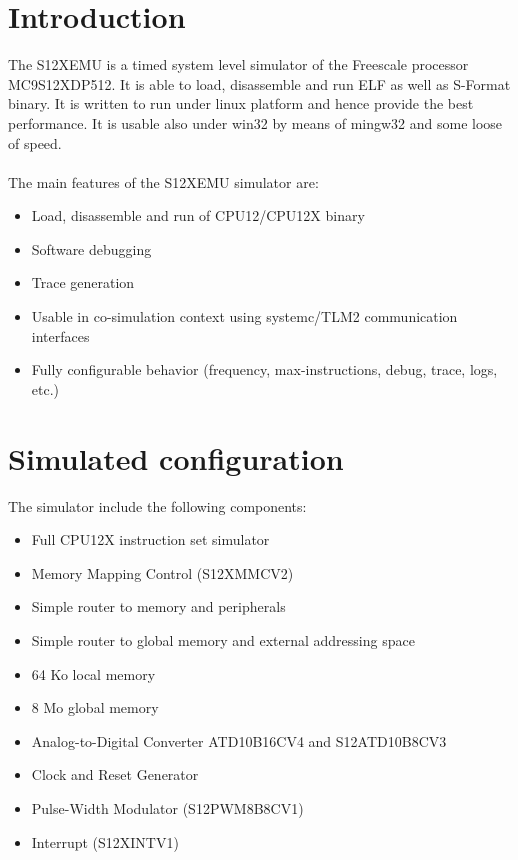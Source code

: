 \section {Introduction}

The S12XEMU is a timed system level simulator of the Freescale processor MC9S12XDP512. It is able to load, disassemble and run ELF as well as S-Format binary. It is written to run under linux platform and hence provide the best performance. It is usable also under win32 by means of mingw32 and some loose of speed.\\
\\
The main features of the S12XEMU simulator are:
\begin{itemize}\addtolength{\itemsep}{-0.40\baselineskip}
\item Load, disassemble and run of CPU12/CPU12X binary
\item Software debugging
\item Trace generation
\item Usable in co-simulation context using systemc/TLM2 communication interfaces
\item Fully configurable behavior (frequency, max-instructions, debug, trace, logs, etc.)
\end{itemize}

\section {Simulated configuration}

The simulator include the following components:
\begin{itemize}\addtolength{\itemsep}{-0.40\baselineskip}
\item Full CPU12X instruction set simulator
\item Memory Mapping Control (S12XMMCV2)
\item Simple router to memory and peripherals
\item Simple router to global memory and external addressing space
\item 64 Ko local memory
\item 8 Mo global memory
\item Analog-to-Digital Converter ATD10B16CV4 and S12ATD10B8CV3
\item Clock and Reset Generator
\item Pulse-Width Modulator (S12PWM8B8CV1)
\item Interrupt (S12XINTV1)
\end{itemize}


